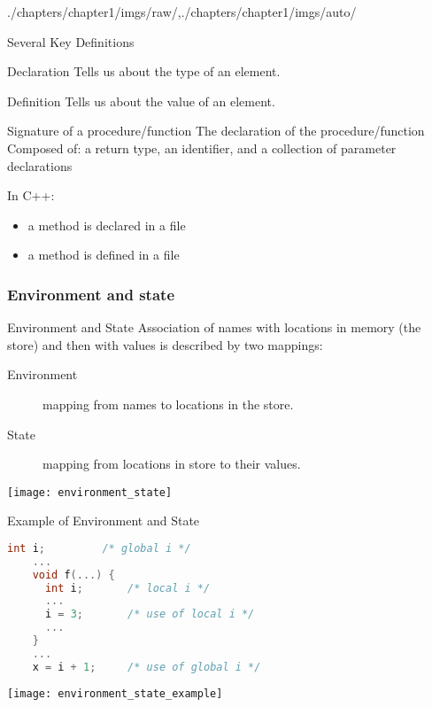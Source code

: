 \begin{graphicspathcontext}{{./chapters/chapter1/imgs/raw/},{./chapters/chapter1/imgs/auto/}}
\begin{bibunit}[apalike]
\begin{frame}{Several Key Definitions \insertcontinuationtext}
	\begin{definitionblock}{Declaration}
		Tells us about the type of an element. 
	\end{definitionblock}
	\begin{definitionblock}{Definition}
		Tells us about the value of an element. 
	\end{definitionblock}
	\begin{definitionblock}{Signature of a procedure/function}
		The declaration of the procedure/function \\
		Composed of: a return type, an identifier, and a collection of parameter declarations
	\end{definitionblock}
	\begin{example}\smaller In C++: \begin{itemize}
		\item a method is declared in a  file
		\item a method is defined in a  file
		\end{itemize}
	\end{example}
\end{frame}

\subsubsection{Environment and state}

\begin{frame}{Environment and State}
	Association of names with locations in memory (the store) and then with values is described by two mappings:
	\begin{description}
	\item[Environment] mapping from names to locations in the store.
	\item[State] mapping from locations in store to their values.
	\end{description}
	\vfill
	\begin{center}
	\texttt{[image: environment\_state]}
	\end{center}
\end{frame}

\begin{frame}[fragile]{Example of Environment and State}
	\begin{lstlisting}[language=C,basicstyle=\normalcolor\smaller\smaller]
	int i;         /* global i */
	...
	void f(...) {
	  int i;       /* local i */
	  ...
	  i = 3;       /* use of local i */
	  ...
	}
	...
	x = i + 1;     /* use of global i */
	\end{lstlisting}
	\vfill
	\begin{center}
	\texttt{[image: environment\_state\_example]}
	\end{center}
\end{frame}


\end{bibunit}
\end{graphicspathcontext}
